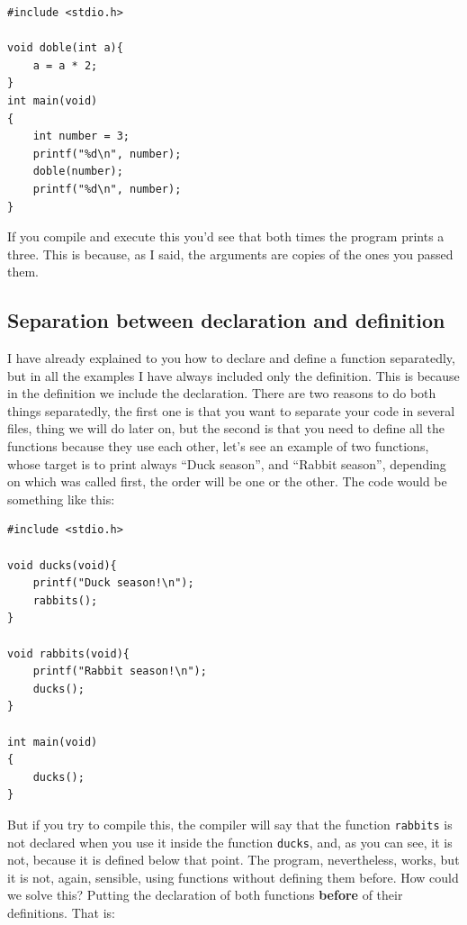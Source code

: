 \documentclass[a4paper]{article}
\begin{document}
\noindent
\begin{minipage}[H]{\linewidth}
\mbox{}
\begin{lstlisting}[style=C, label={lst:functionByValue},
caption={Demostración de que una función recibe copias de sus argumentos}]
#include <stdio.h>

void doble(int a){
    a = a * 2;
}
int main(void)
{
    int number = 3;
    printf("%d\n", number);
    doble(number);
    printf("%d\n", number);
}
\end{lstlisting}
\end{minipage}

If you compile and execute this you'd see that both times the program prints
a three. This is because, as I said, the arguments are copies of the ones
you passed them.

\subsection{Separation between declaration and definition}
I have already explained to you how to declare and define a function
separatedly, but in all the examples I have always included only the definition.
This is because in the definition we include the declaration. There are two
reasons to do both things separatedly, the first one is that you want to
separate your code in several files, thing we will do later on, but the second
is that you need to define all the functions because they use each other, let's
see an example of two functions, whose target is to print always
``Duck season'', and ``Rabbit season'', depending on which was called first,
the order will be one or the other. The code would be something like this:


\noindent
\begin{minipage}[H]{\linewidth}
\mbox{}
\begin{lstlisting}[style=C, label={lst:cyclicFunctions},
caption={Declaration not separated from definition}]
#include <stdio.h>

void ducks(void){
    printf("Duck season!\n");
    rabbits();
}

void rabbits(void){
    printf("Rabbit season!\n");
    ducks();
}

int main(void)
{
    ducks();
}
\end{lstlisting}
\end{minipage}

But if you try to compile this, the compiler will say that the function
\verb!rabbits! is not declared when you use it inside the function \verb!ducks!,
and, as you can see, it is not, because it is defined below that point. The
program, nevertheless, works, but it is not, again, sensible, using functions
without defining them before.
How could we solve this? Putting the declaration of both functions
\textbf{before} of their definitions. That is:
\end{document}
